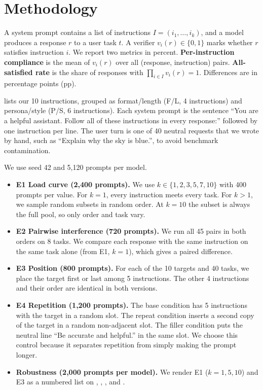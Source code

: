 \section{Methodology}
\label{sec:method}

 A system prompt contains a list of instructions $I = (i_1, \dots, i_k)$, and a model produces a response $r$ to a user task $t$. A verifier $v_i(r) \in \{0, 1\}$ marks whether $r$ satisfies instruction $i$. We report two metrics in percent. {\bf Per-instruction compliance} is the mean of $v_i(r)$ over all (response, instruction) pairs. {\bf All-satisfied rate} is the share of responses with $\prod_{i \in I} v_i(r) = 1$. Differences are in percentage points (pp).

  lists our 10 instructions, grouped as format/length (F/L, 4 instructions) and persona/style (P/S, 6 instructions). Each system prompt is the sentence ``You are a helpful assistant. Follow all of these instructions in every response:'' followed by one instruction per line. The user turn is one of 40 neutral requests that we wrote by hand, such as ``Explain why the sky is blue.'', to avoid benchmark contamination.



 We use seed 42 and 5,120 prompts per model.
\begin{itemize}[leftmargin=*,itemsep=0pt,topsep=0pt]
    \item {\bf E1 Load curve (2,400 prompts).} We use $k \in \{1,2,3,5,7,10\}$ with 400 prompts per value. For $k=1$, every instruction meets every task. For $k>1$, we sample random subsets in random order. At $k=10$ the subset is always the full pool, so only order and task vary.
    \item {\bf E2 Pairwise interference (720 prompts).} We run all 45 pairs in both orders on 8 tasks. We compare each response with the same instruction on the same task alone (from E1, $k=1$), which gives a paired difference.
    \item {\bf E3 Position (800 prompts).} For each of the 10 targets and 40 tasks, we place the target first or last among 5 instructions. The other 4 instructions and their order are identical in both versions.
    \item {\bf E4 Repetition (1,200 prompts).} The base condition has 5 instructions with the target in a random slot. The repeat condition inserts a second copy of the target in a random non-adjacent slot. The filler condition puts the neutral line ``Be accurate and helpful.'' in the same slot. We choose this control because it separates repetition from simply making the prompt longer.
    \item {\bf Robustness (2,000 prompts per model).} We render E1 ($k=1,5,10$) and E3 as a numbered list on \qone, \qthree, \lthree, and \qeight.
\end{itemize}

